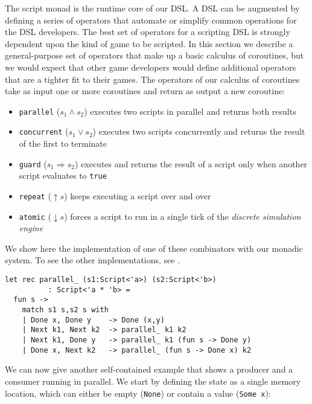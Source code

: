 
The script monad is the runtime core of our DSL. A DSL can be augmented by defining a series of operators that automate or simplify common operations for the DSL developers. The best set of operators for a scripting DSL is strongly dependent upon the kind of game to be scripted. In this section we describe a general-purpose set of operators that make up a basic calculus of coroutines, but we would expect that other game developers would define additional operators that are a tighter fit to their games. The operators of our calculus of coroutines take as input one or more coroutines and return as output a new coroutine:

\begin{itemize}
\item \texttt{parallel} ($s_1 \wedge s_2$) executes two scripts in parallel and returns both results
\item \texttt{concurrent} ($s_1 \vee s_2$) executes two scripts concurrently and returns the result of the first to terminate
\item \texttt{guard} ($s_1 \Rightarrow s_2$) executes and returns the result of a script only when another script evaluates to \texttt{true}
\item \texttt{repeat} ($\uparrow s$) keeps executing a script over and over
\item \texttt{atomic} ($\downarrow s$) forces a script to run in a single tick of the \textit{discrete simulation engine}
\end{itemize}

We show here the implementation of one of these combinators with our monadic system. To see the other implementations, see \cite{FRIENDLY_FSHARP}.

\begin{lstlisting}
let rec parallel_ (s1:Script<'a>) (s2:Script<'b>) 
          : Script<'a * 'b> =
  fun s ->
    match s1 s,s2 s with
    | Done x, Done y    -> Done (x,y)
    | Next k1, Next k2  -> parallel_ k1 k2
    | Next k1, Done y   -> parallel_ k1 (fun s -> Done y)
    | Done x, Next k2   -> parallel_ (fun s -> Done x) k2
\end{lstlisting}


We can now give another self-contained example that shows a producer and a consumer running in parallel. We start by defining the state as a single memory location, which can either be empty (\texttt{None}) or contain a value (\texttt{Some x}):

